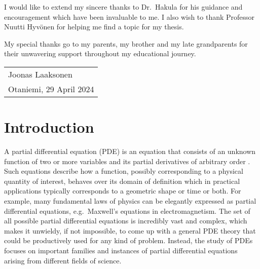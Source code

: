 \documentclass[english, 12pt, a4paper, sci, utf8, a-2b, online]{aaltothesis}
\theoremstyle{definition}
\theoremstyle{plain}
\numberwithin{equation}{section}
\begin{document}
I would like to extend my sincere thanks to Dr.~Hakula for his guidance and encouragement
which have been invaluable to me.
I also wish to thank Professor Nuutti Hyvönen for helping me find a topic for my thesis.

My special thanks go to my parents, my brother and my late grandparents
for their unwavering support throughout my educational journey.

\vspace{7mm}
\hfill
\begin{tabular}{@{}l@{}}
Joonas Laaksonen\\
Otaniemi, 29 April 2024
\end{tabular}
\hspace{1cm}

\newpage

\newpage

\thesistableofcontents

\cleardoublepage

\section{Introduction}
\label{sec:intro}

\thispagestyle{empty}
A partial differential equation (PDE) is an equation that consists of an
unknown function of two or more variables and its partial derivatives of
arbitrary order \cite{evans2010}.
Such equations describe how a function, possibly corresponding to a physical
quantity of interest, behaves over its domain of definition
which in practical applications typically corresponds to a geometric shape or
time or both. For example, many fundamental laws of physics can be elegantly
expressed as partial differential equations, e.g.\ Maxwell's equations
in electromagnetism.
The set of all possible partial differential equations is incredibly vast and
complex, which makes it unwieldy, if not impossible,
to come up with a general PDE theory that could be productively used for any kind
of problem. Instead, the study of PDEs focuses on important families
and instances of partial differential equations arising from
different fields of science.
\end{document}
